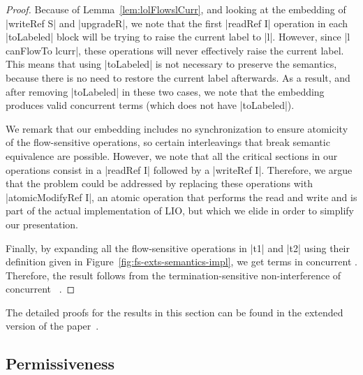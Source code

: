 \begin{proof} Because of Lemma~\ref{lem:lolFlowslCurr}, and
  looking at the embedding of |writeRef S| and |upgradeR|, we note
  that the first |readRef I| operation in each |toLabeled| block will
  be trying to raise the current label to |l|. However, since |l
  canFlowTo lcurr|, these operations will never effectively raise the
  current label. This means that using |toLabeled| is not necessary to
  preserve the semantics, because there is no need to restore the
  current label afterwards. As a result, and after removing
  |toLabeled| in these two cases, we note that the embedding produces
  valid concurrent \lio{} terms (which does not have |toLabeled|).

  We remark that our embedding includes no synchronization to
  ensure atomicity of the flow-sensitive operations, so certain
  interleavings that break semantic equivalence are possible. However,
  we note that all the critical sections in our operations consist in
  a |readRef I| followed by a |writeRef I|. Therefore, we argue that
  the problem could be addressed by replacing these operations with
  |atomicModifyRef I|, an atomic operation that performs the read and write and
  is part of the actual implementation of LIO, but which we elide in order to
  simplify our presentation.

  Finally, by expanding all the flow-sensitive operations in |t1| and |t2|
  using their definition given in
  Figure~\ref{fig:fs-exts-semantics-impl}, we get terms in concurrent
  \lio{}.  Therefore, the result follows from the
  termination-sensitive non-interference of concurrent
  \lio{}~\citep{stefan:addressing-covert}.
\end{proof}

The detailed proofs for the results in this section can be found in the
extended version of the paper~\cite{extended}.

\subsection{Permissiveness}

